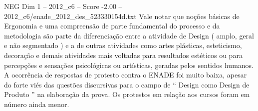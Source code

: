\begin{textsample}{NEG Dim 1 – 2012\_c6 – Score -2.00 – 2012\_c6/enade\_2012\_des\_523330154d.txt}
Vale notar que noções básicas de Ergonomia e uma compreensão de parte fundamental do processo e da metodologia são parte da diferenciação entre a atividade de Design ( amplo, geral e não segmentado ) e a de outras atividades como artes plásticas, esteticismo, decoração e demais atividades mais voltadas para resultados estéticos ou para percepções e sensações psicológicas ou artísticas, geradas pelos sentidos humanos.
A ocorrência de respostas de protesto contra o ENADE foi muito baixa, apesar do forte viés das questões discursivas para o campo de “ Design como Design de Produto ” na elaboração da prova.
Os protestos em relação aos cursos foram em número ainda menor.

\end{textsample}

